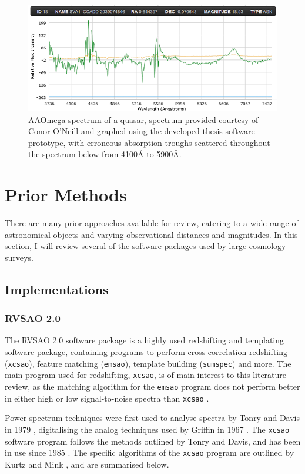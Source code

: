 \documentclass[titlesmallcaps, examinerscopy, copyrightpage]{uqthesis}
\begin{document}
\begin{figure}[ht!]
\includegraphics[width=1\textwidth]{images/dust.PNG} 
\centering
\caption{AAOmega spectrum of a quasar, spectrum provided courtesy of Conor O'Neill and graphed using the developed thesis software prototype, with erroneous absorption troughs scattered throughout the spectrum below from 4100{\AA} to 5900{\AA}.}
\label{fig:dust}
\end{figure}


\chapter{Prior Methods}
\label{ch:prior}

There are many prior approaches available for review, catering to a wide range of astronomical objects and varying observational distances and magnitudes. In this section, I will review several of the software packages used by large cosmology surveys.

\section{Implementations}

\subsection{RVSAO 2.0}

The RVSAO 2.0 software package is a highly used redshifting and templating software package, containing programs to perform cross correlation redshifting (\verb+xcsao+), feature matching (\verb+emsao+), template building (\verb+sumspec+) and more. The main program used for redshifting, \verb+xcsao+, is of main interest to this literature review, as the matching algorithm for the \verb+emsao+ program does not perform better in either high or low signal-to-noise spectra than \verb+xcsao+ \cite{kurtz1998rvsao}.

Power spectrum techniques were first used to analyse spectra by Tonry and Davis in 1979 \cite{tonry1979survey}, digitalising the analog techniques used by Griffin in 1967 \cite{griffin1967photoelectric}. The \verb+xcsao+ software program follows the methods outlined by Tonry and Davis, and has been in use since 1985 \cite{kurtz1998rvsao}. The specific algorithms of the \verb+xcsao+ program are outlined by Kurtz and Mink \cite{kurtz1998rvsao}, and are summarised below.
\end{document}
